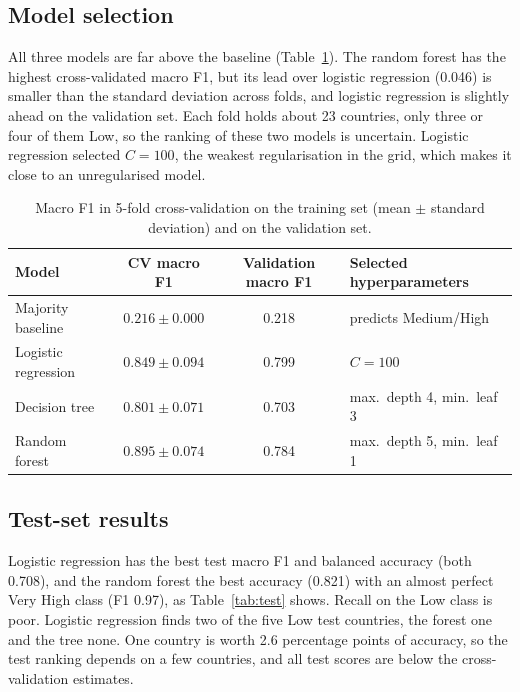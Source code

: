 \documentclass[10pt,a4paper]{article}
\begin{document}
\subsection{Model selection}
All three models are far above the baseline (Table~\ref{tab:cv}). The random forest has the highest
cross-validated macro F1, but its lead over logistic regression (0.046) is smaller than the standard deviation
across folds, and logistic regression is slightly ahead on the validation set. Each fold holds about 23 countries,
only three or four of them Low, so the ranking of these two models is uncertain. Logistic regression selected
$C = 100$, the weakest regularisation in the grid, which makes it close to an unregularised model.

\begin{table}[!htb]
\centering\small
\begin{tabular}{lccl}
\toprule
Model & CV macro F1 & Validation macro F1 & Selected hyperparameters\\
\midrule
Majority baseline & $0.216 \pm 0.000$ & 0.218 & predicts Medium/High\\
Logistic regression & $0.849 \pm 0.094$ & 0.799 & $C = 100$\\
Decision tree & $0.801 \pm 0.071$ & 0.703 & max.\ depth 4, min.\ leaf 3\\
Random forest & $0.895 \pm 0.074$ & 0.784 & max.\ depth 5, min.\ leaf 1\\
\bottomrule
\end{tabular}
\caption{Macro F1 in 5-fold cross-validation on the training set (mean $\pm$ standard deviation) and on the
validation set.}
\label{tab:cv}
\end{table}

\subsection{Test-set results}
Logistic regression has the best test macro F1 and balanced accuracy (both 0.708), and the random forest the best
accuracy (0.821) with an almost perfect Very High class (F1 0.97), as Table~\ref{tab:test} shows. Recall on the
Low class is poor. Logistic regression finds two of the five Low test countries, the forest one and the tree none.
One country is worth 2.6 percentage points of accuracy, so the test ranking depends on a few countries, and all
test scores are below the cross-validation estimates.
\end{document}
